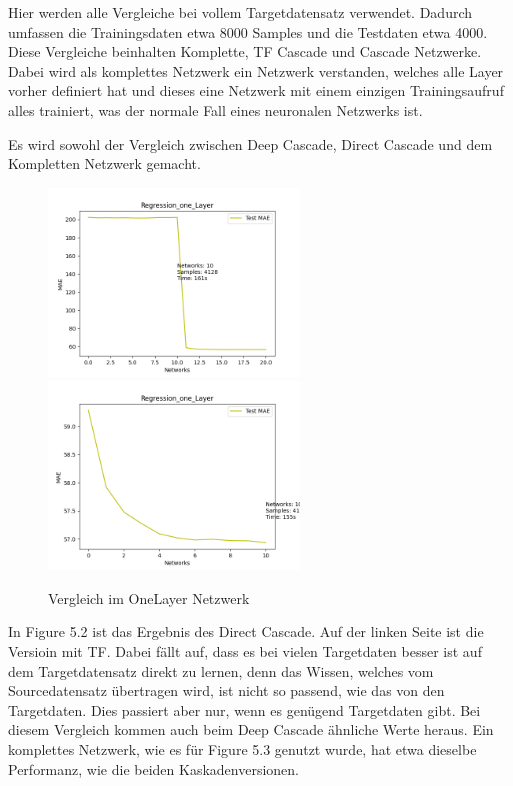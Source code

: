 Hier werden alle Vergleiche bei vollem Targetdatensatz verwendet. 
Dadurch umfassen die Trainingsdaten etwa 8000 Samples und die Testdaten etwa 4000. 
Diese Vergleiche beinhalten Komplette, TF Cascade und Cascade Netzwerke. Dabei wird als komplettes Netzwerk ein Netzwerk verstanden, welches alle 
Layer vorher definiert hat und dieses eine Netzwerk mit einem einzigen Trainingsaufruf alles trainiert, was der normale Fall eines 
neuronalen Netzwerks ist. 

Es wird sowohl der Vergleich zwischen Deep Cascade, Direct Cascade und dem Kompletten Netzwerk gemacht.  

\begin{figure}[htpb]
    \includegraphics[height=5cm]{../../Plots/ba_plots/regression_large/onelayer_ts.png}
    \includegraphics[height=5cm]{../../Plots/ba_plots/regression_large/woonelayer_ts.png}
    \caption{\label{fig:largeregr2} Vergleich im OneLayer Netzwerk}
\end{figure}

In Figure 5.2 ist das Ergebnis des Direct Cascade. Auf der linken Seite ist die Versioin mit TF. Dabei fällt auf, dass es bei vielen 
Targetdaten besser ist auf dem Targetdatensatz direkt zu lernen, denn 
das Wissen, welches vom Sourcedatensatz übertragen wird, ist nicht so passend, wie das von den Targetdaten. Dies passiert aber nur, wenn es 
genügend Targetdaten gibt. Bei diesem Vergleich kommen auch beim Deep Cascade ähnliche Werte heraus. 
Ein komplettes Netzwerk, wie es für Figure 5.3 genutzt wurde, hat etwa dieselbe Performanz, wie die beiden Kaskadenversionen. 

